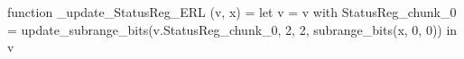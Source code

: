 function _update_StatusReg_ERL (v, x) = let v = { v with StatusReg_chunk_0 = update_subrange_bits(v.StatusReg_chunk_0, 2, 2, subrange_bits(x, 0, 0)) } in
  v
